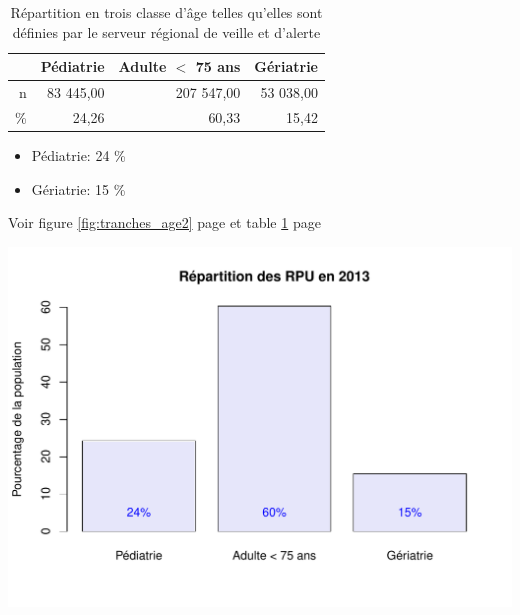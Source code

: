 \documentclass[12pt,english,french,twoside]{book}\usepackage[]{graphicx}\usepackage[]{color}
\makeatletter
\def\maxwidth{ %
  \ifdim\Gin@nat@width>\linewidth
    \linewidth
  \else
    \Gin@nat@width
  \fi
}
\newenvironment{knitrout}{}{} %
\makeatother
\begin{document}

\begin{table}[ht]
\centering
\begin{tabular}{rrrr}
  \hline
 & Pédiatrie & Adulte $<$ 75 ans & Gériatrie \\ 
  \hline
n & 83 445,00 & 207 547,00 & 53 038,00 \\ 
  \% & 24,26 & 60,33 & 15,42 \\ 
   \hline
\end{tabular}
\caption{Répartition en trois classe d'âge telles qu'elles sont définies par le serveur régional de veille et d'alerte} 
\label{tranche_age2}
\end{table}


\begin{itemize}
  \item Pédiatrie:  24 \%
  \item Gériatrie:  15 \%
\end{itemize}

Voir figure \ref{fig:tranches_age2} page \pageref{fig:tranches_age2} et table \ref{tranche_age2} page \pageref{tranche_age2}

\begin{center}
\begin{knitrout}
\color{fgcolor}
\includegraphics[width=\maxwidth]{figure/tranches_age21-1} 

\end{knitrout}
\label{fig:tranches_age2}
\end{center}
\end{document}
